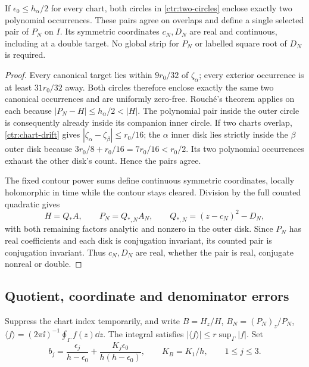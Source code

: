 \begin{lemma}
\label{ctr:matching}
If $\epsilon_0\le h_\alpha/2$ for every chart, both circles in
\eqref{ctr:two-circles} enclose exactly two polynomial occurrences.
These pairs agree on overlaps and define a single selected pair of
$P_N$ on $I$. Its symmetric coordinates $c_N,D_N$ are real and
continuous, including at a double target. No global strip for $P_N$
or labelled square root of $D_N$ is required.
\end{lemma}

\begin{proof}
Every canonical target lies within $9r_0/32$ of $\zeta_\alpha$;
every exterior occurrence is at least $31r_0/32$ away. Both circles
therefore enclose exactly the same two canonical occurrences and are
uniformly zero-free. Rouch\'e's theorem applies on each because
$|P_N-H|\le h_\alpha/2<|H|$. The polynomial pair inside the outer
circle is consequently already inside its companion inner circle.
If two charts overlap, \eqref{ctr:chart-drift} gives
$|\zeta_\alpha-\zeta_\beta|\le r_0/16$; the $\alpha$ inner disk
lies strictly inside the $\beta$ outer disk because
$3r_0/8+r_0/16=7r_0/16<r_0/2$. Its two polynomial occurrences exhaust
the other disk's count. Hence the pairs agree.

The fixed contour power sums define continuous symmetric coordinates,
locally holomorphic in time while the contour stays cleared. Division
by the full counted quadratic gives
\begin{equation}
 H=Q_*A,\qquad P_N=Q_{*,N}A_N,\qquad
 Q_{*,N}=(z-c_N)^2-D_N,
 \label{ctr:factorization}
\end{equation}
with both remaining factors analytic and nonzero in the outer disk.
Since $P_N$ has real coefficients and each disk is conjugation
invariant, its counted pair is conjugation invariant. Thus $c_N,D_N$
are real, whether the pair is real, conjugate nonreal or double.
\end{proof}

\subsection{Quotient, coordinate and denominator errors}

Suppress the chart index temporarily, and write
$B=H_z/H$, $B_N=(P_N)_z/P_N$,
$\langle f\rangle=(2\pi\ii)^{-1}\oint_\Gamma f(z)\dd z$.
The integral satisfies $|\langle f\rangle|\le r\sup_\Gamma|f|$.
Set
\begin{equation}
 b_j=\frac{\epsilon_j}{h-\epsilon_0}
       +\frac{K_j\epsilon_0}{h(h-\epsilon_0)},\qquad
 K_B=K_1/h,\qquad 1\le j\le3.
 \label{ctr:quotient-errors}
\end{equation}


